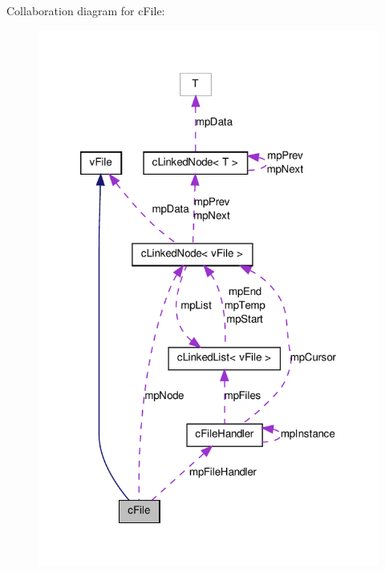 Collaboration diagram for cFile:
\nopagebreak
\begin{figure}[H]
\begin{center}
\leavevmode
\includegraphics[width=320pt]{classc_file__coll__graph}
\end{center}
\end{figure}
